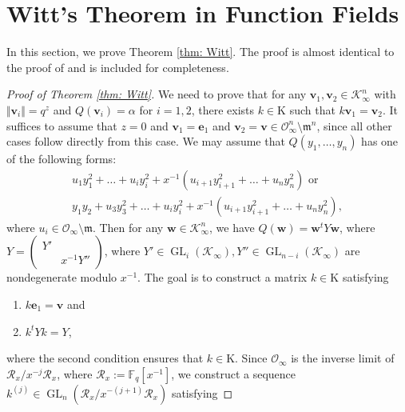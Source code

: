\documentclass[11pt,a4paper,reqno]{amsart}
\theoremstyle{definition}
\theoremstyle{remark}
\numberwithin{equation}{section}
\begin{document}
\section{Witt's Theorem in Function Fields}
\label{sec:Witt}
In this section, we prove Theorem \ref{thm: Witt}. The proof is almost identical to the proof of \cite[Proposition A1]{HLM} and is included for completeness. 
\begin{proof}[Proof of Theorem \ref{thm: Witt}]
    We need to prove that for any $\mathbf{v}_1,\mathbf{v}_2\in \mathcal{K}_{\infty}^n$ with $\Vert \mathbf{v}_i\Vert=q^z$ and $Q(\mathbf{v}_i)=\alpha$ for $i=1,2$, there exists $k\in \mathrm{K}$ such that $k\mathbf{v}_1=\mathbf{v}_2$. It suffices to assume that $z=0$ and $\mathbf{v}_1=\mathbf{e}_1$ and $\mathbf{v}_2=\mathbf{v}\in \mathcal{O}_{\infty}^n\setminus \mathfrak{m}^n$, since all other cases follow directly from this case. We may assume that $Q(y_1,\dots,y_n)$ has one of the following forms:
    \begin{equation}
        \begin{split}
            u_1y_1^2+\dots+u_iy_i^2+x^{-1}(u_{i+1}y_{i+1}^2+\dots+u_ny_n^2)\text{  or }\\
            y_1y_2+u_3y_3^2+\dots+u_iy_i^2+x^{-1}(u_{i+1}y_{i+1}^2+\dots+u_ny_n^2),
        \end{split}
    \end{equation}
    where $u_i\in \mathcal{O}_{\infty}\setminus \mathfrak{m}$.
    Then for any $\mathbf{w}\in \mathcal{K}_{\infty}^n$, we have $Q(\mathbf{w})=\mathbf{w}^tY\mathbf{w}$, where  $Y=\begin{pmatrix}
        Y'&\\
        &x^{-1}Y''
    \end{pmatrix}$, where $Y'\in \operatorname{GL}_i(\mathcal{K}_{\infty}),Y''\in \operatorname{GL}_{n-i}(\mathcal{K}_{\infty})$ are nondegenerate modulo $x^{-1}$. The goal is to construct a matrix $k\in \mathrm{K}$ satisfying
    \begin{enumerate}
        \item \label{cond:Transitive} $k\mathbf{e}_1=\mathbf{v}$ and
        \item \label{cond:StabQ} $k^tYk=Y$,
    \end{enumerate}
    where the second condition ensures that $k\in \mathrm{K}$. Since $\mathcal{O}_{\infty}$ is the inverse limit of $\mathcal{R}_x/x^{-j}\mathcal{R}_x$, where $\mathcal{R}_x:=\mathbb{F}_q[x^{-1}]$, we construct a sequence $k^{(j)}\in \operatorname{GL}_n(\mathcal{R}_x/x^{-(j+1)}\mathcal{R}_x)$ satisfying

\end{proof}
\end{document}
